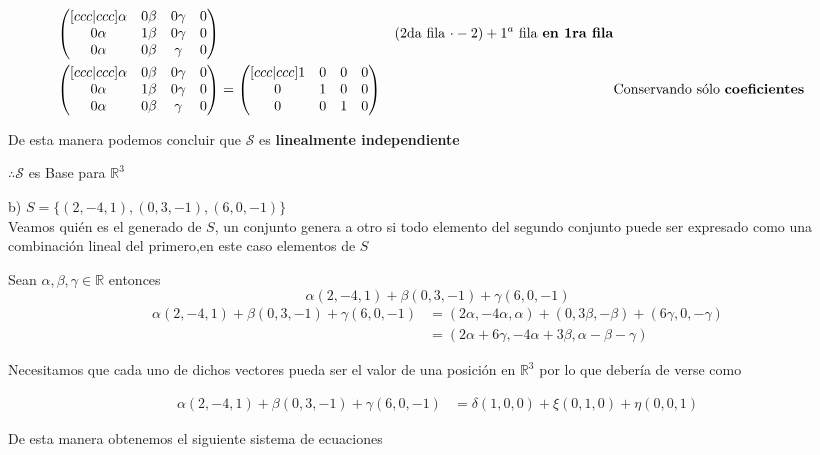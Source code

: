 \documentclass[letterpaper]{article}
\newcommand{\R}{\mathds{R}}
\renewcommand{\*}{\cdot}
\theoremstyle{definition}
\begin{document}
\begin{align*}
\begin{pmatrix}[ccc|ccc]
		\alpha & 0\beta & 0\gamma & 0\\
		0\alpha & 1\beta & 0\gamma& 0\\
		0\alpha & 0\beta & \gamma & 0
		\end{pmatrix} && \text{(2da fila $ \* -2) + 1^{a} $ fila \textbf{en 1ra fila}}\\
		\begin{pmatrix}[ccc|ccc]
		\alpha & 0\beta & 0\gamma & 0\\
		0\alpha & 1\beta & 0\gamma& 0\\
		0\alpha & 0\beta & \gamma &0
		\end{pmatrix} & = \begin{pmatrix}[ccc|ccc]
		1 & 0 & 0 &0\\
		0 & 1 & 0& 0\\
		0 & 0 & 1 & 0
		\end{pmatrix} && \text{Conservando sólo \textbf{coeficientes}}
		\end{align*}
		
		De esta manera podemos concluir que $ \mathcal{S} $ es \textbf{linealmente independiente} 
		\begin{center}
			$ \therefore \mathcal{S} $ es Base para $ \R^3 $ 
		\end{center}
	b) $S = \lbrace (2,-4,1),(0,3,-1),(6,0,-1) \rbrace$\\
	Veamos quién es el generado de $ S $, un conjunto genera a otro si todo elemento del segundo conjunto puede ser expresado como una combinación lineal del primero,en este caso elementos de $ S $
	
	Sean $ \alpha, \beta, \gamma  \in \R$ entonces 
	\[\alpha(2,-4,1) + \beta(0,3,-1) + \gamma(6,0,-1)  \]
	\begin{align*}
		\alpha(2,-4,1) + \beta(0,3,-1) + \gamma(6,0,-1)  &= (2\alpha, -4\alpha, \alpha) + (0, 3\beta, -\beta) + (6\gamma, 0, -\gamma)\\
		&= (2\alpha + 6\gamma, -4\alpha + 3\beta, \alpha - \beta - \gamma)
	\end{align*}
	
	Necesitamos que cada uno de dichos vectores pueda ser el valor de una posición en $ \R^3 $ por lo que debería de verse como
	
	\begin{align*}
	\alpha(2,-4,1) + \beta(0,3,-1) + \gamma(6,0,-1)  &= \delta(1,0,0) + \xi(0, 1, 0) + \eta(0,0,1)
	\end{align*}	
	
	De esta manera obtenemos el siguiente sistema de ecuaciones
	
\end{document}
